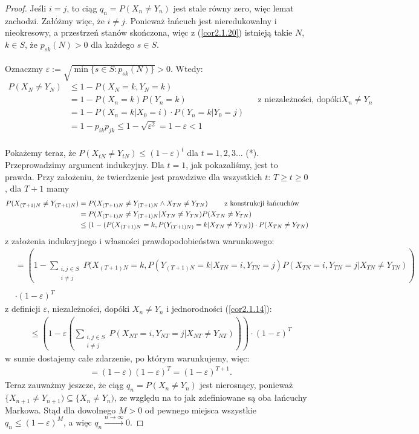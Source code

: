 \documentclass[a4paper]{article}
\theoremstyle{defn}
\theoremstyle{theorem}
\theoremstyle{lemma}
\theoremstyle{cor}
\theoremstyle{fact}
\begin{document}
\begin{proof}
Jeśli $i = j$, to ciąg $q_n = P(X_n \neq Y_n)$ jest stale równy zero, więc lemat zachodzi. Załóżmy więc, że $i \neq j$. Ponieważ łańcuch jest nieredukowalny i nieokresowy, a przestrzeń stanów skończona, więc z (\ref{cor2.1.20}) istnieją takie $N$, $k \in S$, że $p_{sk}(N) > 0$ dla każdego $s \in S$.\\\\
Oznaczmy $\varepsilon := \sqrt{\min\{s \in S: p_{sk}(N)\}} > 0$. Wtedy: 
\begin{align*}
P(X_N \neq Y_N) &\leq 1 - P(X_N = k, Y_N = k) \\
&= 1 - P(X_n = k)P(Y_n = k) && \text{z niezależności, dopóki $X_n \neq Y_n$} \\
&= 1 - P(X_n = k|X_0 = i) \cdot P(Y_n = k|Y_0 = j) \\
&= 1 - p_{ik}p_{jk} \leq 1 - \sqrt{\varepsilon^2} = 1 - \varepsilon < 1
\end{align*}
\\
Pokażemy teraz, że $P(X_{tN} \neq Y_{tN}) \leq (1-\varepsilon)^t$ dla $t=1,2,3...$ (*). Przeprowadzimy argument indukcyjny. Dla $t = 1$, jak pokazaliśmy, jest to prawda. Przy założeniu, że twierdzenie jest prawdziwe dla wszystkich $t$: $T \geq t \geq 0$, dla $T+1$ mamy 
\begin{align*}
    P(X_{(T+1)N} \neq Y_{(T+1)N}) &= P(X_{(T+1)N} \neq Y_{(T+1)N} \land X_{TN} \neq Y_{TN})
    \text{ \quad\quad z konstrukcji łańcuchów}\\
    &= P(X_{(T+1)N} \neq Y_{(T+1)N} | X_{TN} \neq Y_{TN})P(X_{TN} \neq Y_{TN})\\
    &\leq (1 - (P(X_{(T+1)N} = k, P(Y_{(T+1)N)} = k  |  X_{TN} \neq Y_{TN})) \cdot P(X_{TN} \neq Y_{TN})
    \end{align*}
    z założenia indukcyjnego i własności prawdopodobieństwa warunkowego:
    \begin{align*}
    & = \left(1 - \sum\limits_{\substack{i,j \in S\\i\neq j}} P(X_{(T+1)N} = k, P(Y_{(T+1)N} = k | X_{TN} = i, Y_{TN} = j)P(X_{TN} = i, Y_{TN} = j | X_{TN} \neq Y_{TN})\right)\\\\
    &\cdot (1 - \varepsilon)^T
\end{align*}
 z definicji $\varepsilon$, niezależności, dopóki $X_n \neq Y_n$ i jednorodności (\ref{cor2.1.14}):
\begin{align*}
    &\leq \left( 1 - \varepsilon \left(\sum_{\substack{i,j \in S\\i\neq j}} P(X_{NT} = i, Y_{NT} = j | X_{NT} \neq Y_{NT})\right)\right)\cdot (1- \varepsilon)^T
\end{align*}
w sumie dostajemy całe zdarzenie, po którym warunkujemy, więc:
\begin{align*}
    &= (1-\varepsilon)(1-\varepsilon)^T = (1- \varepsilon)^{T+1}.
\end{align*}
Teraz zauważmy jeszcze, że ciąg $q_n = P(X_n \neq Y_n)$ jest nierosnący, ponieważ $\{X_{n+1} \neq Y_{n+1}) \subseteq \{X_{n} \neq Y_{n})$, ze względu na to jak zdefiniowane są oba łańcuchy Markowa. Stąd dla dowolnego $M > 0$ od pewnego miejsca wszystkie $q_n \leq (1-\varepsilon)^M$, a więc $q_n \xrightarrow{n \to \infty} 0$. 
\end{proof}
\end{document}
